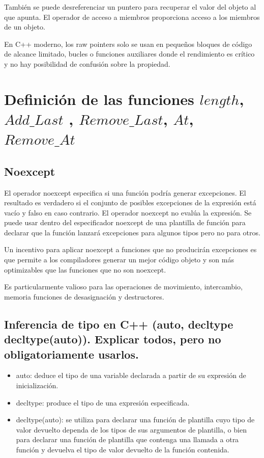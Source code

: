 \documentclass[10pt]{article}
\begin{document}
También se puede desreferenciar un puntero para recuperar el valor del objeto al que apunta. El operador de acceso a miembros proporciona acceso a los miembros de un objeto.

En C++ moderno, los raw pointers solo se usan en pequeños bloques de código de alcance limitado, bucles o funciones auxiliares donde el rendimiento es crítico y no hay posibilidad de confusión sobre la propiedad.

\vspace{2em}
\section{Definici\'on de las funciones $ length $, $ Add\_Last $ , $ Remove\_Last $, $ At $, $ Remove\_At $}

\subsection{Noexcept}

El operador noexcept especifica si una función podría generar excepciones. El resultado es verdadero si el conjunto de posibles excepciones de la expresión está vacío y falso en caso contrario. El operador noexcept no evalúa la expresión. Se puede usar dentro del especificador noexcept de una plantilla de función para declarar que la función lanzará excepciones para algunos tipos pero no para otros.

Un incentivo para aplicar noexcept a funciones que no producir\'an excepciones es que permite a los compiladores generar un mejor código objeto y son más optimizables que las funciones que no son noexcept.

Es particularmente valioso para las operaciones de movimiento, intercambio, memoria funciones de desasignación y destructores.

\subsection{Inferencia de tipo en C++ (auto, decltype decltype(auto)). Explicar todos, pero no obligatoriamente usarlos.}

\begin{itemize}
	\item auto: deduce el tipo de una variable declarada a partir de su expresión de inicialización.
	\item decltype: produce el tipo de una expresión especificada.
	\item decltype(auto): se utiliza para declarar una función de plantilla cuyo tipo de valor devuelto dependa de los tipos de sus argumentos de plantilla, o bien para declarar una función de plantilla que contenga una llamada a otra función y devuelva el tipo de valor devuelto de la función contenida.
\end{itemize}
\end{document}

